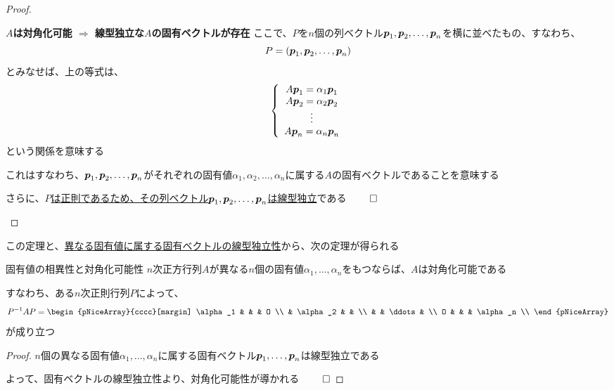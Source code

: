 \documentclass[../../../topic_linear-algebra]{subfiles}
\begin{document}
\begin{proof}
\begin{subpattern}{\bfseries $A$は対角化可能 $\Longrightarrow$ 線型独立な$A$の固有ベクトルが存在}
    ここで、$P$を$n$個の列ベクトル$\vb*{p}_1, \vb*{p}_2, \ldots, \vb*{p}_n$を横に並べたもの、すなわち、
    \begin{equation*}
      P = (\vb*{p}_1, \vb*{p}_2, \ldots, \vb*{p}_n)
    \end{equation*}
    とみなせば、上の等式は、
    \begin{equation*}
      \left\{
      \begin{array}{c}
        A\vb*{p}_1 = \alpha_1 \vb*{p}_1 \\
        A\vb*{p}_2 = \alpha_2 \vb*{p}_2 \\
        \vdots                          \\
        A\vb*{p}_n = \alpha_n \vb*{p}_n
      \end{array}
      \right.
    \end{equation*}
    という関係を意味する

    これはすなわち、$\vb*{p}_1, \vb*{p}_2, \ldots, \vb*{p}_n$がそれぞれの固有値$\alpha_1, \alpha_2, \ldots, \alpha_n$に属する$A$の固有ベクトルであることを意味する

    さらに、\hyperref[thm:invertible-iff-col-indep]{$P$は正則であるため、その列ベクトル$\vb*{p}_1, \vb*{p}_2, \ldots, \vb*{p}_n$は線型独立}である $\qed$
  \end{subpattern}
\end{proof}

この定理と、\hyperref[thm:eigenvectors-of-distinct-eigenvalues-are-independent]{異なる固有値に属する固有ベクトルの線型独立性}から、次の定理が得られる

\begin{theorem}{固有値の相異性と対角化可能性}
  $n$次正方行列$A$が異なる$n$個の固有値$\alpha_1, \ldots, \alpha_n$をもつならば、$A$は対角化可能である

  すなわち、ある$n$次正則行列$P$によって、
  \begin{equation*}
    P^{-1}AP = \begin{pNiceArray}{cccc}[margin]
      \alpha_1 & & & O \\
      & \alpha_2 & & \\
      & & \ddots & \\
      O & & & \alpha_n \\
    \end{pNiceArray}
  \end{equation*}
  が成り立つ
\end{theorem}

\begin{proof}
  $n$個の異なる固有値$\alpha_1, \ldots, \alpha_n$に属する固有ベクトル$\vb*{p}_1, \ldots, \vb*{p}_n$は線型独立である

  よって、固有ベクトルの線型独立性より、対角化可能性が導かれる $\qed$
\end{proof}
\end{document}
